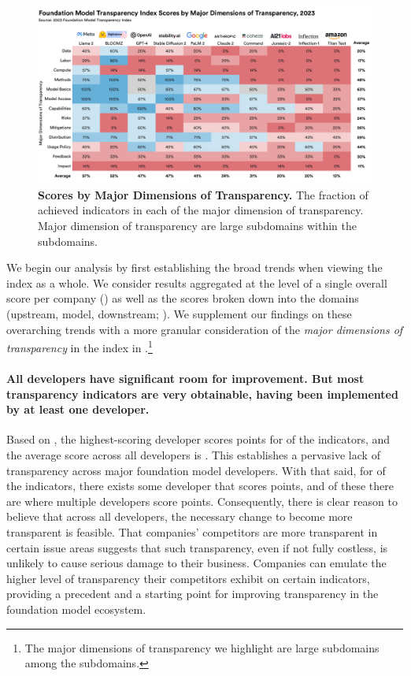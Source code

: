 \begin{figure}
\centering
\includegraphics[keepaspectratio, height=\textheight, width=\textwidth]{figures/heatmap_selected_subdomains.pdf}
\caption{\textbf{Scores by Major Dimensions of Transparency.} 
The fraction of achieved indicators in each of the \nummajorsubdomains major dimension of transparency. 
Major dimension of transparency are large subdomains within the \numsubdomains subdomains.}
\label{fig:major-subdomain-scores}
\end{figure}

We begin our analysis by first establishing the broad trends when viewing the index as a whole.
We consider results aggregated at the level of a single overall score per company () as well as the scores broken down into the \numdomains domains (upstream, model, downstream; ).
We supplement our findings on these overarching trends with a more granular consideration of the \textit{major dimensions of transparency} in the index in .\footnote{
The major dimensions of transparency we highlight are \nummajorsubdomains large subdomains among the \numsubdomains subdomains. }


\paragraph{All developers have significant room for improvement. But most transparency indicators are very obtainable, having been implemented by at least one developer.}
Based on , the highest-scoring developer scores points for \maxscore of the \numindicators indicators, and the average score across all developers is \meanscore.
This establishes a pervasive lack of transparency across major foundation model developers.
With that said, for \numfeasible of the \numindicators indicators, there exists some developer that scores points, and of these there are \numfeasiblemultiple where multiple developers score points. 
Consequently, there is clear reason to believe that across all developers, the necessary change to become more transparent is feasible.
That companies' competitors are more transparent in certain issue areas suggests that such transparency, even if not fully costless, is unlikely to cause serious damage to their business.
Companies can emulate the higher level of transparency their competitors exhibit on certain indicators, providing a precedent and a starting point for improving transparency in the foundation model ecosystem. 

